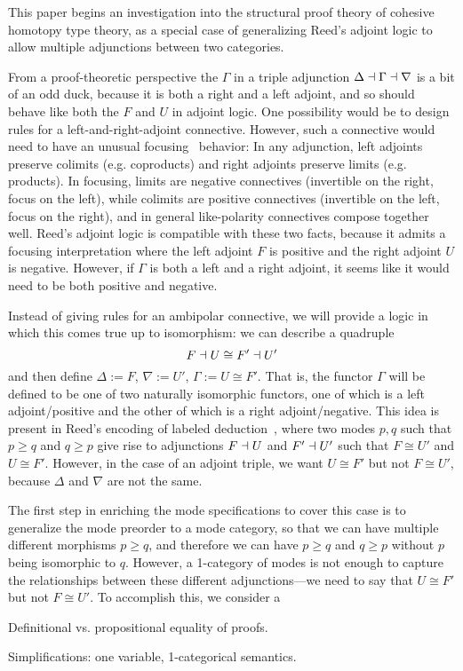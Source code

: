 \documentclass{drl-common/llncs}
\begin{document}
This paper begins an investigation into the structural proof theory of
cohesive homotopy type theory, as a special case of generalizing Reed's
adjoint logic to allow multiple adjunctions between two categories.




From a proof-theoretic perspective the $\Gamma$ in a triple adjunction
$\Delta \dashv \Gamma \dashv \nabla$ is a bit of an odd duck, because it is
both a right and a left adjoint, and so should behave like both the $F$
and $U$ in adjoint logic.  One possibility would be to design rules for
a left-and-right-adjoint connective.  However, such a connective would
need to have an unusual focusing~\citep{andreoli92focus} behavior: In
any adjunction, left adjoints preserve colimits (e.g. coproducts) and
right adjoints preserve limits (e.g. products).  In focusing, limits are
negative connectives (invertible on the right, focus on the left), while
colimits are positive connectives (invertible on the left, focus on the
right), and in general like-polarity connectives compose together well.
Reed's adjoint logic is compatible with these two facts, because it
admits a focusing interpretation where the left adjoint $F$ is positive
and the right adjoint $U$ is negative.  However, if $\Gamma$ is both a
left and a right adjoint, it seems like it would need to be both
positive and negative.  

Instead of giving rules for an ambipolar connective, we will provide a
logic in which this comes true up to isomorphism: we can describe a quadruple
\[
F \dashv U \cong F' \dashv U'
\]
and then define $\Delta := F$, $\nabla := U'$, $\Gamma := U \cong F'$.
That is, the functor $\Gamma$ will be defined to be one of two naturally
isomorphic functors, one of which is a left adjoint/positive and the
other of which is a right adjoint/negative.  This idea is present in
Reed's encoding of labeled deduction~\citep[Section ?]{reed09adjoint},
where two modes $p,q$ such that $p \ge q$ and $q \ge p$ give rise to
adjunctions $F \dashv U$ and $F' \dashv U'$ such that $F \cong U'$ and $U
\cong F'$.  However, in the case of an adjoint triple, we want $U \cong
F'$ but not $F \cong U'$, because $\Delta$ and $\nabla$ are not the
same.  

The first step in enriching the mode specifications to cover this case
is to generalize the mode preorder to a mode category, so that we can
have multiple different morphisms $p \ge q$, and therefore we can have
$p \ge q$ and $q \ge p$ without $p$ being isomorphic to $q$.  However, a
1-category of modes is not enough to capture the relationships between
these different adjunctions---we need to say that $U \cong F'$ but not
$F \cong U'$.  To accomplish this, we consider a 

Definitional vs. propositional equality of proofs.  

Simplifications: one variable, 1-categorical semantics.  








{ %


}
\end{document}
